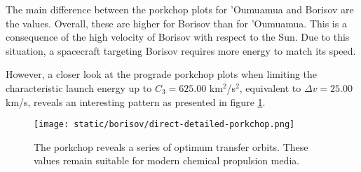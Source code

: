 The main difference between the porkchop plots for 'Oumuamua and Borisov are the
values. Overall, these are higher for Borisov than for 'Oumuamua. This is a
consequence of the high velocity of Borisov with respect to the Sun. Due to this
situation, a spacecraft targeting Borisov requires more energy to match its
speed.

However, a closer look at the prograde porkchop plots when limiting the characteristic
launch energy up to $C_3 = 625.00$ km$^2$/s$^2$, equivalent to $\Delta v =
25.00$ km/s, reveals an interesting pattern as presented in figure
\ref{fig:borisov-direct-detailed-porkchop}.

\begin{figure}[H]
  \centering
  \texttt{[image: static/borisov/direct-detailed-porkchop.png]}
        \caption[Detailed porkchop showing the optimum transfer for
        2I/Borisov]{The porkchop reveals a series of optimum transfer orbits.
        These values remain suitable for modern chemical propulsion media.}
  \label{fig:borisov-direct-detailed-porkchop}
\end{figure}
